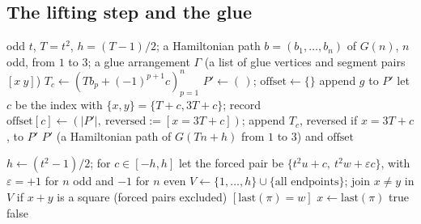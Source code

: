 \subsection{The lifting step and the glue}

\begin{algorithm}[h]
\caption{Lift (\cref{lem:segments,prop:lift})}\label{alg:lift}
\begin{algorithmic}[1]
\Require odd $t$, $T=t^2$, $h=(T-1)/2$; a Hamiltonian path $b=(b_1,\dots,b_n)$ of $G(n)$, $n$ odd, from $1$ to $3$;
a glue arrangement $\Gamma$ (a list of glue vertices and segment pairs $[x\ y]$)
  \State $T_c\gets(Tb_p+(-1)^{p+1}c)_{p=1}^n$ 
\EndFor
\State $P'\gets(\,)$; $\mathrm{offset}\gets\{\}$
   append $g$ to $P'$
   let $c$ be the index with $\{x,y\}=\{T+c,3T+c\}$;
    \State \hspace{1.2em} record $\mathrm{offset}[c]\gets(|P'|,\ \text{reversed}:=[x=3T+c])$;
    \State \hspace{1.2em} append $T_c$, reversed if $x=3T+c$, to $P'$
  \EndIf
\EndFor
\State \Return $P'$ (a Hamiltonian path of $G(Tn+h)$ from $1$ to $3$) and $\mathrm{offset}$
\end{algorithmic}
\end{algorithm}

\begin{algorithm}[h]
\caption{Glue search for $(t,u,w,\text{parity of }n)$}\label{alg:glue}
\begin{algorithmic}[1]
\State $h\gets(t^2-1)/2$; for $c\in[-h,h]$ let the forced pair be $\{t^2u+c,\ t^2w+\varepsilon c\}$, with $\varepsilon=+1$ for $n$ odd and $-1$ for $n$ even
\State $V\gets\{1,\dots,h\}\cup\{\text{all endpoints}\}$; join $x\ne y$ in $V$ if $x+y$ is a square (forced pairs excluded)
 
   \Return $[\text{last}(\pi)=w]$ \EndIf
  \State $x\gets\text{last}(\pi)$
     \State \Return {} 
  \EndIf
      \Return true \EndIf
  \EndFor
  \State \Return false
\EndProcedure
\State {} 
\end{algorithmic}
\end{algorithm}


